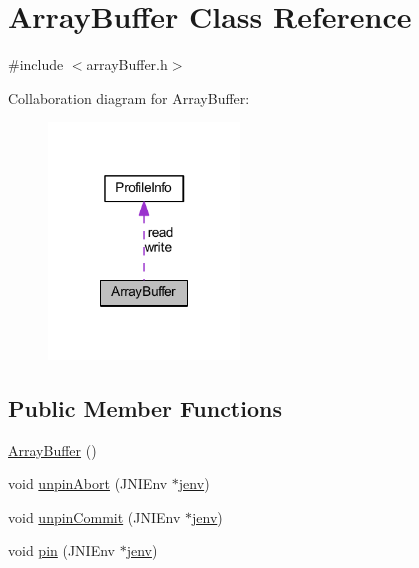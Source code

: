 \hypertarget{class_array_buffer}{\section{Array\-Buffer Class Reference}
\label{class_array_buffer}
}


{\ttfamily \#include $<$array\-Buffer.\-h$>$}



Collaboration diagram for Array\-Buffer\-:
\nopagebreak
\begin{figure}[H]
\begin{center}
\leavevmode
\includegraphics[width=144pt]{class_array_buffer__coll__graph}
\end{center}
\end{figure}
\subsection*{Public Member Functions}
\begin{DoxyCompactItemize}
\item 
\hyperlink{class_array_buffer_a63fcf9bffe928ffa800313815019ac79}{Array\-Buffer} ()
\item 
void \hyperlink{class_array_buffer_a76231eefe415da5bba1754f3cc2045f9}{unpin\-Abort} (J\-N\-I\-Env $\ast$\hyperlink{aparapi_8cpp_a31595c73e9a3750524b2ff61b5a14f96}{jenv})
\item 
void \hyperlink{class_array_buffer_a112827b6241d6f9029e993e4ab419bd2}{unpin\-Commit} (J\-N\-I\-Env $\ast$\hyperlink{aparapi_8cpp_a31595c73e9a3750524b2ff61b5a14f96}{jenv})
\item 
void \hyperlink{class_array_buffer_ae3247a8375aadcdd840780275305c60f}{pin} (J\-N\-I\-Env $\ast$\hyperlink{aparapi_8cpp_a31595c73e9a3750524b2ff61b5a14f96}{jenv})
\end{DoxyCompactItemize}
